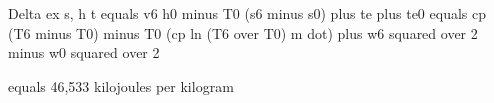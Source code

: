 Delta ex s, h t equals v6 h0 minus T0 (s6 minus s0) plus te plus te0  
equals cp (T6 minus T0) minus T0 (cp ln (T6 over T0) m dot) plus w6 squared over 2 minus w0 squared over 2  

equals 46,533 kilojoules per kilogram